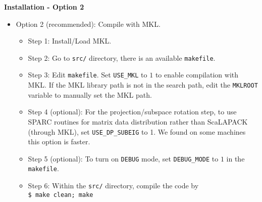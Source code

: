   \begin{frame}{\textbf{Installation - Option 2}} \label{Installation:2}
  
  \begin{itemize}
  \item Option 2 (recommended): Compile with MKL.
    \begin{itemize}
      \item Step 1: Install/Load MKL.
      \item Step 2: Go to \texttt{src/} directory, there is an available \texttt{makefile}.
      \item Step 3: Edit \texttt{makefile}. Set \texttt{USE\_MKL} to $1$ to enable compilation with MKL. If the MKL library path is not in the search path, edit the \texttt{MKLROOT} variable to manually set the MKL path.
      \item Step 4 (optional): For the projection/subspace rotation step, to use SPARC routines for matrix data distribution rather than ScaLAPACK (through MKL), set \texttt{USE\_DP\_SUBEIG} to 1. We found on some machines this option is faster.
      \item Step 5 (optional): To turn on \texttt{DEBUG} mode, set \texttt{DEBUG\_MODE} to $1$ in the \texttt{makefile}.
      \item Step 6: Within the \texttt{src/} directory, compile the code by \\
            \texttt{\$ make clean; make}
    \end{itemize}
  \end{itemize}
  
  \end{frame}
  
